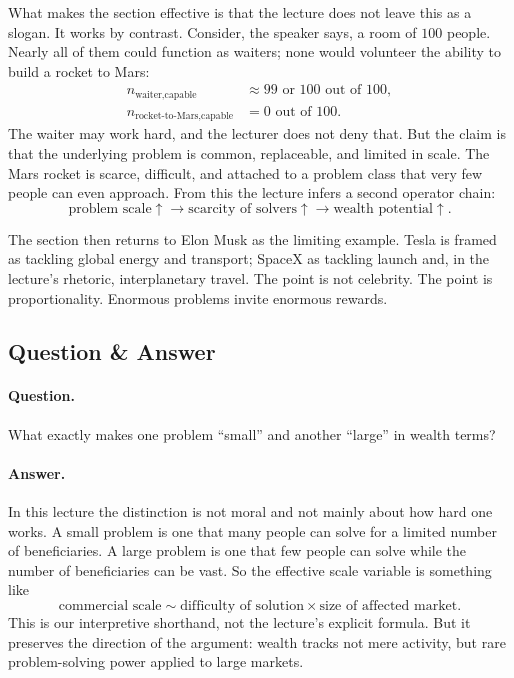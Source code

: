 What makes the section effective is that the lecture does not leave this as a slogan. It works by contrast. Consider, the speaker says, a room of \(100\) people. Nearly all of them could function as waiters; none would volunteer the ability to build a rocket to Mars:
\begin{align}
n_{\text{waiter,capable}} &\approx 99\text{ or }100 \text{ out of }100, \\
n_{\text{rocket-to-Mars,capable}} &= 0 \text{ out of }100.
\end{align}
The waiter may work hard, and the lecturer does not deny that. But the claim is that the underlying problem is common, replaceable, and limited in scale. The Mars rocket is scarce, difficult, and attached to a problem class that very few people can even approach. From this the lecture infers a second operator chain:
\begin{equation}
\text{problem scale}\uparrow \to \text{scarcity of solvers}\uparrow \to \text{wealth potential}\uparrow.
\end{equation}

The section then returns to Elon Musk as the limiting example. Tesla is framed as tackling global energy and transport; SpaceX as tackling launch and, in the lecture's rhetoric, interplanetary travel. The point is not celebrity. The point is proportionality. Enormous problems invite enormous rewards.

\subsection{Question \& Answer}

\paragraph{Question.} What exactly makes one problem ``small'' and another ``large'' in wealth terms?

\paragraph{Answer.} In this lecture the distinction is not moral and not mainly about how hard one works. A small problem is one that many people can solve for a limited number of beneficiaries. A large problem is one that few people can solve while the number of beneficiaries can be vast. So the effective scale variable is something like
\begin{equation}
\text{commercial scale} \sim \text{difficulty of solution} \times \text{size of affected market}.
\end{equation}
This is our interpretive shorthand, not the lecture's explicit formula. But it preserves the direction of the argument: wealth tracks not mere activity, but rare problem-solving power applied to large markets.

